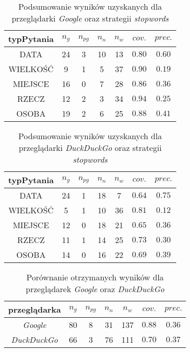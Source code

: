 \begin{table}[h]
	\centering
	\begin{tabular}{|c|c|c|c|c|c|c| }
	
	\hline
	\textbf{typPytania} & $n_g$ &$n_{pg}$&$n_n$&$n_w$&$cov.$&$prec.$  \\ \hline
	DATA&24&3&10&13&$\num{0.80}$&$\num{0.60}$ \\ \hline
	WIELKOŚĆ&9&1&5&37&$\num{0.90}$&$\num{0.19}$ \\ \hline
	MIEJSCE&16&0&7&28&$\num{0.86}$&$\num{0.36}$ \\ \hline
	RZECZ&12&2&3&34&$\num{0.94}$&$\num{0.25}$\\ \hline
	OSOBA&19&2&6&25&$\num{0.88}$&$\num{0.41}$\\ \hline
	\end{tabular}
	\caption{Podsumowanie wyników uzyskanych dla przeglądarki \textit{Google} oraz strategii \textit{stopwords}}
	
	\label{tab:googleStopwords}
	
\end{table}

\begin{table}[h]
	\centering
	\begin{tabular}{|c|c|c|c|c|c|c| }
		
		\hline
		\textbf{typPytania} & $n_g$ &$n_{pg}$&$n_n$&$n_w$&$cov.$&$prec.$  \\ \hline
		DATA&24&1&18&7&$\num{0.64}$&$\num{0.75}$ \\ \hline
		WIELKOŚĆ&5&1&10&36&$\num{0.81}$&$\num{0.12}$ \\ \hline
		MIEJSCE&12&0&18&21&$\num{0.65}$&$\num{0.36}$ \\ \hline
		RZECZ&11&1&14&25&$\num{0.73}$&$\num{0.30}$\\ \hline
		OSOBA&14&0&16&22&$\num{0.69}$&$\num{0.39}$\\ \hline
	\end{tabular}
	\caption{Podsumowanie wyników uzyskanych dla przeglądarki \textit{DuckDuckGo} oraz strategii \textit{stopwords}}
	
	\label{tab:DuckStopwords}
	
\end{table}

\begin{table}[h]
	\centering
	\begin{tabular}{|c|c|c|c|c|c|c| }
		
		\hline
		\textbf{przeglądarka} & $n_g$ &$n_{pg}$&$n_n$&$n_w$&$cov.$&$prec.$  \\ \hline
		\textit{Google}&80&8&31&137&$\num{0.88}$&$\num{0.36}$ \\ \hline
		\textit{DuckDuckGo}&66&3&76&111&$\num{0.70}$&$\num{0.37}$ \\ \hline
	\end{tabular}
	\caption{Porównanie otrzymanych wyników dla przeglądarek \textit{Google} oraz \textit{DuckDuckGo}}
	
	\label{tab:porownanieWysz}
	
\end{table}

